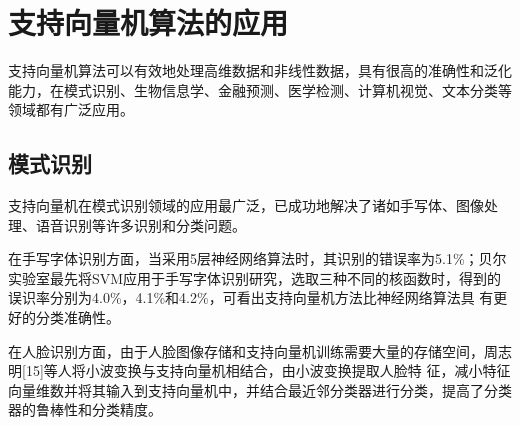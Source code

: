 \chapter{\hei 支持向量机算法的应用}
支持向量机算法可以有效地处理高维数据和非线性数据，具有很高的准确性和泛化能力，在模式识别、生物信息学、金融预测、医学检测、计算机视觉、文本分类等领域都有广泛应用。
\section{模式识别}
支持向量机在模式识别领域的应用最广泛，已成功地解决了诸如手写体、图像处理、语音识别等许多识别和分类问题。

在手写字体识别方面，当采用5层神经网络算法时，其识别的错误率为5.1\%；贝尔实验室\cite{cortes1995support}最先将SVM应用于手写字体识别研究，选取三种不同的核函数时，得到的误识率分别为4.0\%，4.1\%和4.2\%，可看出支持向量机方法比神经网络算法具 有更好的分类准确性。

在人脸识别方面，由于人脸图像存储和支持向量机训练需要大量的存储空间，周志明[15]等人将小波变换与支持向量机相结合，由小波变换提取人脸特 征，减小特征向量维数并将其输入到支持向量机中，并结合最近邻分类器进行分类，提高了分类器的鲁棒性和分类精度。